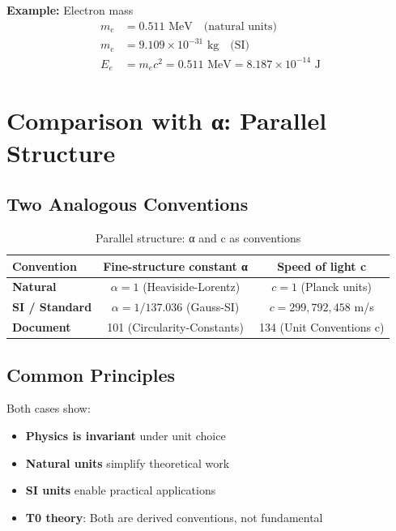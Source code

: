 	\textbf{Example:} Electron mass
	\begin{align}
		m_e &= 0.511 \text{ MeV} \quad \text{(natural units)} \\
		m_e &= 9.109 \times 10^{-31} \text{ kg} \quad \text{(SI)} \\
		E_e &= m_e c^2 = 0.511 \text{ MeV} = 8.187 \times 10^{-14} \text{ J}
	\end{align}
	
	\section{Comparison with α: Parallel Structure}
	
	\subsection{Two Analogous Conventions}
	
	\begin{table}[h]
		\centering
		\begin{tabular}{|l|c|c|}
			\hline
			\textbf{Convention} & \textbf{Fine-structure constant α} & \textbf{Speed of light c} \\
			\hline
			\textbf{Natural} & $\alpha = 1$ (Heaviside-Lorentz) & $c = 1$ (Planck units) \\
			\textbf{SI / Standard} & $\alpha = 1/137.036$ (Gauss-SI) & $c = 299,792,458$ m/s \\
			\hline
			\textbf{Document} & 101 (Circularity-Constants) & 134 (Unit Conventions c) \\
			\hline
		\end{tabular}
		\caption{Parallel structure: α and c as conventions}
	\end{table}
	
	\subsection{Common Principles}
	
	Both cases show:
	\begin{itemize}
		\item \textbf{Physics is invariant} under unit choice
		\item \textbf{Natural units} simplify theoretical work
		\item \textbf{SI units} enable practical applications
		\item \textbf{T0 theory}: Both are derived conventions, not fundamental
	\end{itemize}
	
